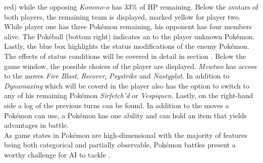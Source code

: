 red) while the opposing \textit{Kommo-o} has 33\% of \ac{HP} remaining. Below the avatars of both players,
the remaining team is displayed, marked yellow for player two. While player one has three Pokémon remaining,
his opponent has four members alive. The Pokéball (bottom right) indicates an to the player unknown Pokémon.
Lastly, the blue box highlights the status modifications of the enemy Pokémon. The effects of status conditions
will be covered in detail in section . Below the game window, the possible choices of the
player are displayed. \textit{Mewtwo} has access to the moves \textit{Fire Blast}, \textit{Recover}, \textit{Psystrike}
and \textit{Nastyplot}. In addition to \textit{Dynamaxing} which will be coverd in  the player
also has the option to switch to any of his remaining Pokémon \textit{Sirfetch'd} or \textit{Vespiquen}. Lastly,
on the right-hand side a log of the previous turns can be found. In addition to the moves a Pokémon can use,
a Pokémon has one ability and can hold an item that yields advantages in battle. \\
As game states in Pokémon are high-dimensional with the majority of features being both categorical and 
partially observable, Pokémon battles present a worthy challenge for AI to tackle .
